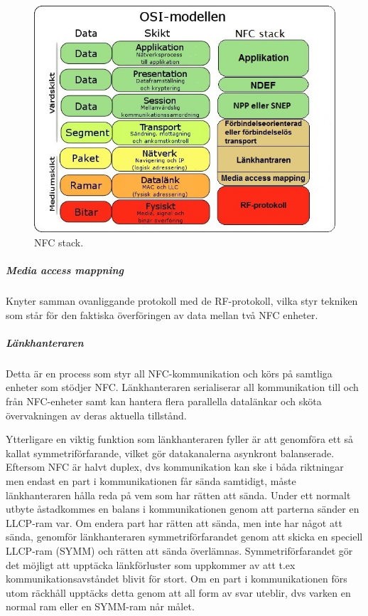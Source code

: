 \documentclass[11pt]{article}
\begin{document}
\begin{figure}[H]
\centering
\includegraphics[scale=0.8]{NFC_stack_detail.jpg}
\caption{NFC stack.}
\label{fig:NFC_stack_detail}
\end{figure}

\subparagraph{Media access mappning}
Knyter samman ovanliggande protokoll med de RF-protokoll, vilka styr tekniken som står för den faktiska överföringen av data mellan två NFC enheter. 

\subparagraph{Länkhanteraren}
Detta är en process som styr all NFC-kommunikation och körs på samtliga enheter som stödjer NFC. Länkhanteraren serialiserar all kommunikation till och från NFC-enheter samt kan hantera flera parallella datalänkar och sköta övervakningen av deras aktuella tillstånd.

Ytterligare en viktig funktion som länkhanteraren fyller är att genomföra ett så kallat symmetriförfarande, vilket gör datakanalerna asynkront balanserade. Eftersom NFC är halvt duplex, dvs kommunikation kan ske i båda riktningar men endast en part i kommunikationen får sända samtidigt, måste länkhanteraren hålla reda på vem som har rätten att sända. Under ett normalt utbyte åstadkommes en balans i kommunikationen genom att parterna sänder en LLCP-ram var. Om endera part har rätten att sända, men inte har något att sända, genomför länkhanteraren symmetriförfarandet genom att skicka en speciell LLCP-ram (SYMM) och rätten att sända överlämnas. Symmetriförfarandet gör det möjligt att upptäcka länkförluster som uppkommer av att t.ex kommunikationsavståndet blivit för stort. Om en part i kommunikationen förs utom räckhåll upptäcks detta genom att all form av svar uteblir, dvs varken en normal ram eller en SYMM-ram når målet.
\end{document}
